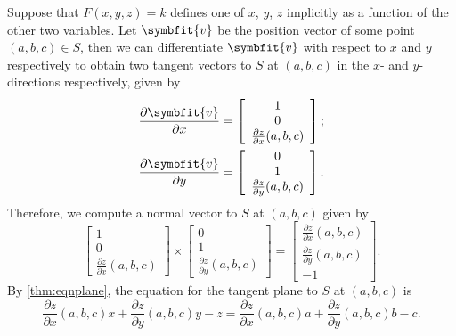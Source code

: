 \documentclass[math]{amznotes}
\theoremstyle{remark}
\begin{document}
Suppose that $F(x, y, z) = k$ defines one of $x$, $y$, $z$ implicitly as a function of the other two variables. Let $\symbfit{v}$ be the position vector of some point $(a, b, c) \in S$, then we can differentiate $\symbfit{v}$ with respect to $x$ and $y$ respectively to obtain two tangent vectors to $S$ at $(a, b, c)$ in the $x$- and $y$-directions respectively, given by
\begin{align*}
    \frac{\partial \symbfit{v}}{\partial x} & = \left[\begin{array}{c}
        1 \\
        0 \\
        \frac{\partial z}{\partial x}(a, b, c)
    \end{array}\right]; \\
    \frac{\partial \symbfit{v}}{\partial y} & = \left[\begin{array}{c}
        0 \\
        1 \\
        \frac{\partial z}{\partial y}(a, b, c)
    \end{array}\right].
\end{align*}
Therefore, we compute a normal vector to $S$ at $(a, b, c)$ given by
\begin{equation*}
    \left[\begin{array}{c}
        1 \\
        0 \\
        \frac{\partial z}{\partial x}(a, b, c)
    \end{array}\right] \times \left[\begin{array}{c}
        0 \\
        1 \\
        \frac{\partial z}{\partial y}(a, b, c)
    \end{array}\right] = \left[\begin{array}{c}
        \frac{\partial z}{\partial x}(a, b, c) \\
        \frac{\partial z}{\partial y}(a, b, c) \\
        -1
    \end{array}\right].
\end{equation*}
By \ref{thm:eqnplane}, the equation for the tangent plane to $S$ at $(a, b, c)$ is
\begin{equation*}
    \frac{\partial z}{\partial x}(a, b, c)x + \frac{\partial z}{\partial y}(a, b, c)y - z = \frac{\partial z}{\partial x}(a, b, c)a + \frac{\partial z}{\partial y}(a, b, c)b - c.
\end{equation*}
\end{document}
